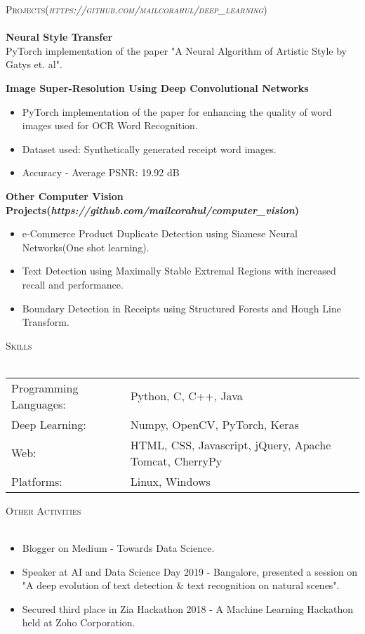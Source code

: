 \documentclass[a4paper]{article}
\newcommand{\lineunder} {
    \vspace*{-8pt} \\
    \hspace*{-18pt} \hrulefill \\
}
\newcommand{\header} [1] {
    {\hspace*{-18pt}\vspace*{6pt} \textsc{#1}}
    \vspace*{-6pt} \lineunder
}
\begin{document}
\header{Projects(\textit{https://github.com/mailcorahul/deep\_learning})}
{\textbf{Neural Style Transfer}}\\
PyTorch implementation of the paper "A Neural Algorithm of Artistic Style by Gatys et. al".\\
\vspace*{2mm}

{\textbf{Image Super-Resolution Using Deep Convolutional Networks}}\\
\begin{itemize}
    \itemsep-0.5em
    \item PyTorch implementation of the paper for enhancing the quality of word images used for OCR Word Recognition.
    \item Dataset used: Synthetically generated receipt word images.
    \item Accuracy - Average PSNR: 19.92 dB
\end{itemize}

\vspace*{2mm}
{\textbf{Other Computer Vision Projects(\textit{https://github.com/mailcorahul/computer\_vision})}}
    \begin{itemize}
        \itemsep-0.5em
        \item e-Commerce Product Duplicate Detection using Siamese Neural Networks(One shot learning).
        \item Text Detection using Maximally Stable Extremal Regions with increased recall and performance.
        \item Boundary Detection in Receipts using Structured Forests and Hough Line Transform.\\
    \end{itemize}


\header{Skills}
\begin{tabular}{ l l }
    Programming Languages: & Python, C, C++, Java                                   \\
    Deep Learning:         & Numpy, OpenCV, PyTorch, Keras                          \\
    Web:                   & HTML, CSS, Javascript, jQuery, Apache Tomcat, CherryPy \\
    Platforms:             & Linux, Windows                                         \\
\end{tabular}
\vspace{2mm}

\header{Other Activities}
    \begin{itemize}
    \item Blogger on Medium - Towards Data Science.
    \item Speaker at AI and Data Science Day 2019 - Bangalore, presented a session on "A deep evolution of text detection \& text recognition on natural scenes".
    \item Secured third place in Zia Hackathon 2018 - A Machine Learning Hackathon held at Zoho Corporation.
    \end{itemize}

\vspace*{2mm}
\end{document}
